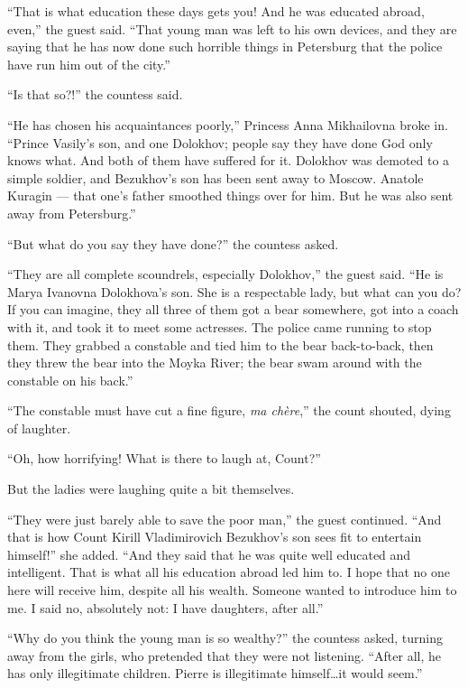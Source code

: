``That is what education these days gets you! And he was educated abroad, even,'' the guest said. ``That young man was left to his own devices, and they are saying that he has now done such horrible things in Petersburg that the police have run him out of the city.''

``Is that so?!'' the countess said. %

``He has chosen his acquaintances poorly,'' Princess Anna Mikhailovna broke in. ``Prince Vasily's son, and one Dolokhov; people say they have done God only knows what. And both of them have suffered for it. Dolokhov was demoted to a simple soldier, and Bezukhov's son has been sent away to Moscow. Anatole Kuragin --- that one's father smoothed things over for him. But he was also sent away from Petersburg.'' %

``But what do you say they have done?'' the countess asked. %

``They are all complete scoundrels, especially Dolokhov,'' the guest said. ``He is Marya Ivanovna Dolokhova's son. She is a respectable lady, but what can you do? If you can imagine, they all three of them got a bear somewhere, got into a coach with it, and took it to meet some actresses. The police came running to stop them. They grabbed a constable and tied him to the bear back-to-back, then they threw the bear into the Moyka River; the bear swam around with the constable on his back.''

``The constable must have cut a fine figure, \textit{ma ch\`ere},'' the count shouted, dying of laughter. %

``Oh, how horrifying! What is there to laugh at, Count?''

But the ladies were laughing quite a bit themselves.

``They were just barely able to save the poor man,'' the guest continued. ``And that is how Count Kirill Vladimirovich Bezukhov's son sees fit to entertain himself!'' she added. ``And they said that he was quite well educated and intelligent. That is what all his education abroad led him to. I hope that no one here will receive him, despite all his wealth. Someone wanted to introduce him to me. I said no, absolutely not: I have daughters, after all.''

``Why do you think the young man is so wealthy?'' the countess asked, turning away from the girls, who pretended that they were not listening. ``After all, he has only illegitimate children. Pierre is illegitimate himself\ldots{}it would seem.'' %

